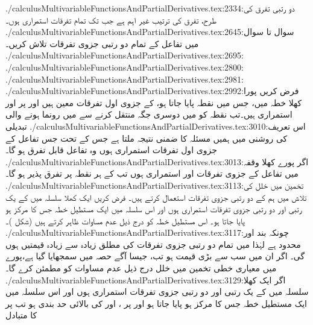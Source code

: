 ./calculusMultivariableFunctionsAndPartialDerivatives.tex:2334:دو رتبی تفرق کی طرح،   تفرق کی ترتیب غیر اہم ہے جب تک تمام  تفرقات استمراری ہوں۔
./calculusMultivariableFunctionsAndPartialDerivatives.tex:2645:سوال  تا سوال  میں تفاعل کے تمام دو رتبی جزوی تفرقات تلاش کریں۔
./calculusMultivariableFunctionsAndPartialDerivatives.tex:2695:\\
./calculusMultivariableFunctionsAndPartialDerivatives.tex:2800:\\
./calculusMultivariableFunctionsAndPartialDerivatives.tex:2981:
./calculusMultivariableFunctionsAndPartialDerivatives.tex:2992:فرض کریں    پورا کھلا  خطہ  میں، جس میں نقطہ  پایا جاتا ہو،      کے    جزوی  اول تفرقات  معین  ہیں اور  پر  اور  استمراری ہیں۔تب نقطہ  کو  میں    دوسری جگہ   منتقل کرنے سے  میں رونما ہونے والی تبدیلی
./calculusMultivariableFunctionsAndPartialDerivatives.tex:3010:اس تعریف کی روشنی میں ہمیں مسئلہ  کا  ضمنی نتیجہ ملتا ہے جس کے تحت  جس تفاعل کے   جزوی اول   تفرقات استمراری ہوں وہ تفاعل قابل تفرق ہو گا۔
./calculusMultivariableFunctionsAndPartialDerivatives.tex:3013:اگر پورے کھلا وقفہ  میں تفاعل  کے جزوی تفرقات  اور  استمراری ہوں تب  کے ہر نقطہ پر  تفرق پذیر ہو گا۔
./calculusMultivariableFunctionsAndPartialDerivatives.tex:3113:تخمین   میں خلل کی تلاش میں ہم  کے دو  رتبی  جزوی تفرقات استعمال کرتے ہیں۔ فرض کریں ایک  کھلا  سلسلہ  میں  کے یک رتبی اور دو رتبی جزوی تفرقات استمراری ہوں اور اس سلسلہ   میں ایک  مستطیل خطہ    جس کا مرکز  ہو پایا جاتا ہو۔ اس مستطیل خطہ کو  درج ذیل عدم مساوات  ظاہر کرتے ہیں (شکل )۔
./calculusMultivariableFunctionsAndPartialDerivatives.tex:3117:چونکہ  بند اور محدود ہے لہٰذا  میں    تمام دو رتبی جزوی تفرقات  کی مطلق   زیادہ سے زیادہ قیمتیں ہوں گی۔ اگر ان میں  سب سے بڑی قیمت ہو تب، جیسا   آگے حصہ  میں سمجھایا گیا ہے،پورے  میں   معیاری خطی تخمین میں خلل   درج ذیل عدم مساوات کو مطمئن کرے گا۔ 
./calculusMultivariableFunctionsAndPartialDerivatives.tex:3129:اگر   ایک  کھلا  سلسلہ  میں  کے یک رتبی اور دو رتبی جزوی تفرقات استمراری ہوں اور اس سلسلہ   میں ایک  مستطیل خطہ    جس کا مرکز  ہو پایا جاتا ہو  اور  پر ،  اور   کی بالائی حد  بندی  ہو   تب    پر  کا متبادل 
